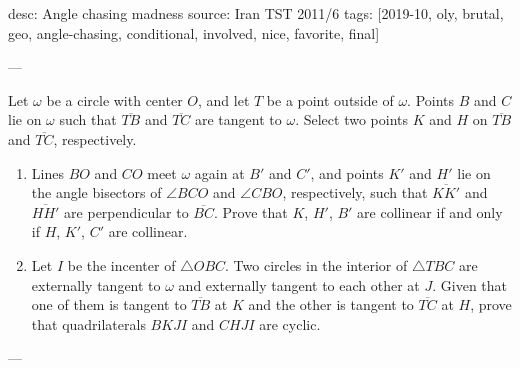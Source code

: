 desc: Angle chasing madness
source: Iran TST 2011/6
tags: [2019-10, oly, brutal, geo, angle-chasing, conditional, involved, nice, favorite, final]

---

Let $\omega$ be a circle with center $O$, and let $T$ be a point outside of $\omega$. Points $B$ and $C$ lie on $\omega$ such that $\overline{TB}$ and $\overline{TC}$ are tangent to $\omega$. Select two points $K$ and $H$ on $\overline{TB}$ and $\overline{TC}$, respectively.
\begin{enumerate}[label=(\alph*)]
    \item Lines $BO$ and $CO$ meet $\omega$ again at $B'$ and $C'$, and points $K'$ and $H'$ lie on the angle bisectors of $\angle BCO$ and $\angle CBO$, respectively, such that $\overline{KK'}$ and $\overline{HH'}$ are perpendicular to $\overline{BC}$. Prove that $K$, $H'$, $B'$ are collinear if and only if $H$, $K'$, $C'$ are collinear.
    \item Let $I$ be the incenter of $\triangle OBC$. Two circles in the interior of $\triangle TBC$ are externally tangent to $\omega$ and externally tangent to each other at $J$. Given that one of them is tangent to $\overline{TB}$ at $K$ and the other is tangent to $\overline{TC}$ at $H$, prove that quadrilaterals $BKJI$ and $CHJI$ are cyclic.
\end{enumerate}

---

